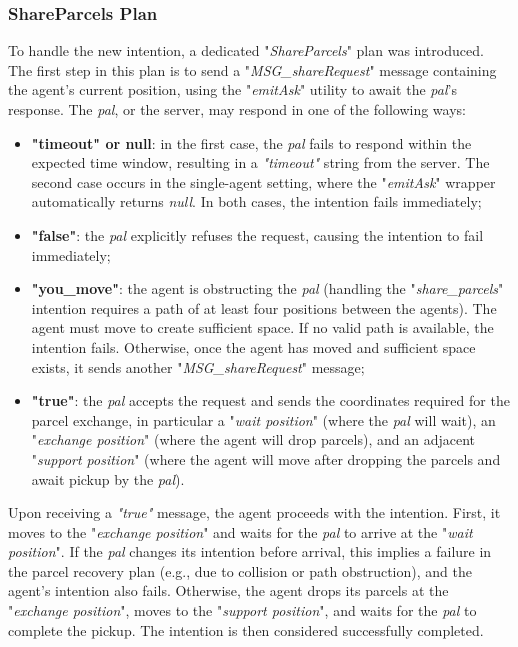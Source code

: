         \subsubsection{ShareParcels Plan}
            To handle the new intention, a dedicated "\textit{ShareParcels}" plan was introduced. The first step in this plan is to send a "\textit{MSG\_shareRequest}" message containing the agent's current position, using the "\textit{emitAsk}" utility to await the \textit{pal}'s response. The \textit{pal}, or the server, may respond in one of the following ways:
            \begin{itemize}
                \item \textbf{"timeout" or null}: in the first case, the \textit{pal} fails to respond within the expected time window, resulting in a \textit{"timeout"} string from the server. The second case occurs in the single-agent setting, where the "\textit{emitAsk}" wrapper automatically returns \textit{null}. In both cases, the intention fails immediately;
                \item \textbf{"false"}: the \textit{pal} explicitly refuses the request, causing the intention to fail immediately;
                \item \textbf{"you\_move"}: the agent is obstructing the \textit{pal} (handling the "\textit{share\_parcels}" intention requires a path of at least four positions between the agents). The agent must move to create sufficient space. If no valid path is available, the intention fails. Otherwise, once the agent has moved and sufficient space exists, it sends another "\textit{MSG\_shareRequest}" message;
                \item \textbf{"true"}: the \textit{pal} accepts the request and sends the coordinates required for the parcel exchange, in particular a "\textit{wait position}" (where the \textit{pal} will wait), an "\textit{exchange position}" (where the agent will drop parcels), and an adjacent "\textit{support position}" (where the agent will move after dropping the parcels and await pickup by the \textit{pal}).
            \end{itemize}                   
            Upon receiving a \textit{"true"} message, the agent proceeds with the intention. First, it moves to the "\textit{exchange position}" and waits for the \textit{pal} to arrive at the "\textit{wait position}". If the \textit{pal} changes its intention before arrival, this implies a failure in the parcel recovery plan (e.g., due to collision or path obstruction), and the agent's intention also fails. Otherwise, the agent drops its parcels at the "\textit{exchange position}", moves to the "\textit{support position}", and waits for the \textit{pal} to complete the pickup. The intention is then considered successfully completed.

